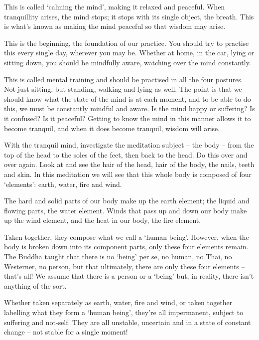  This is called `calming the mind', making it relaxed and peaceful. When tranquillity arises, the mind stops; it stops with its single object, the breath. This is what's known as making the mind peaceful so that wisdom may arise. 

 This is the beginning, the foundation of our practice. You should try to practise this every single day, wherever you may be. Whether at home, in the car, lying or sitting down, you should be mindfully aware, watching over the mind constantly. 

 This is called mental training and should be practised in all the four postures. Not just sitting, but standing, walking and lying as well. The point is that we should know what the state of the mind is at each moment, and to be able to do this, we must be constantly mindful and aware. Is the mind happy or suffering? Is it confused? Is it peaceful? Getting to know the mind in this manner allows it to become tranquil, and when it does become tranquil, wisdom will arise. 

 With the tranquil mind, investigate the meditation subject -- the body -- from the top of the head to the soles of the feet, then back to the head. Do this over and over again. Look at and see the hair of the head, hair of the body, the nails, teeth and skin. In this meditation we will see that this whole body is composed of four `elements': earth, water, fire and wind. 

 The hard and solid parts of our body make up the earth element; the liquid and flowing parts, the water element. Winds that pass up and down our body make up the wind element, and the heat in our body, the fire element. 

 Taken together, they compose what we call a `human being'. However, when the body is broken down into its component parts, only these four elements remain. The Buddha taught that there is no `being' per se, no human, no Thai, no Westerner, no person, but that ultimately, there are only these four elements -- that's all! We assume that there is a person or a `being' but, in reality, there isn't anything of the sort. 

 Whether taken separately as earth, water, fire and wind, or taken together labelling what they form a `human being', they're all impermanent, subject to suffering and not-self. They are all unstable, uncertain and in a state of constant change -- not stable for a single moment!

